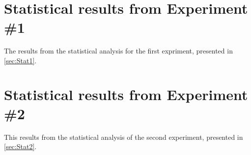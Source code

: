 \section{Statistical results from Experiment \#1}\label{app:stat1}
The results from the statistical analysis for the first expriment, presented in \cref{sec:Stat1}.




% 



% 
% 
\newpage

\section{Statistical results from Experiment \#2}\label{app:stat2}
This results from the statistical analysis of the second experiment, presented in \cref{sec:Stat2}.
% 

% 



% 


















